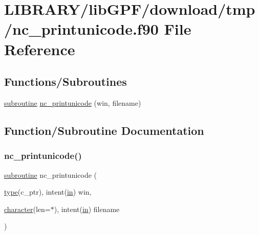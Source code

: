 \hypertarget{nc__printunicode_8f90}{}\section{L\+I\+B\+R\+A\+R\+Y/lib\+G\+P\+F/download/tmp/nc\+\_\+printunicode.f90 File Reference}
\label{nc__printunicode_8f90}
\subsection*{Functions/\+Subroutines}
\begin{DoxyCompactItemize}
\item 
\hyperlink{M__stopwatch_83_8txt_acfbcff50169d691ff02d4a123ed70482}{subroutine} \hyperlink{nc__printunicode_8f90_ab56a30537897cb7b2a3e7e4c44767b05}{nc\+\_\+printunicode} (win, filename)
\end{DoxyCompactItemize}


\subsection{Function/\+Subroutine Documentation}
\mbox{\label{nc__printunicode_8f90_ab56a30537897cb7b2a3e7e4c44767b05}} 
\subsubsection{\texorpdfstring{nc\+\_\+printunicode()}{nc\_printunicode()}}
{\footnotesize\ttfamily \hyperlink{M__stopwatch_83_8txt_acfbcff50169d691ff02d4a123ed70482}{subroutine} nc\+\_\+printunicode (\begin{DoxyParamCaption}\item[{\hyperlink{stop__watch_83_8txt_a70f0ead91c32e25323c03265aa302c1c}{type}(c\+\_\+ptr), intent(\hyperlink{M__journal_83_8txt_afce72651d1eed785a2132bee863b2f38}{in})}]{win,  }\item[{\hyperlink{option__stopwatch_83_8txt_abd4b21fbbd175834027b5224bfe97e66}{character}(len=$\ast$), intent(\hyperlink{M__journal_83_8txt_afce72651d1eed785a2132bee863b2f38}{in})}]{filename }\end{DoxyParamCaption})}




